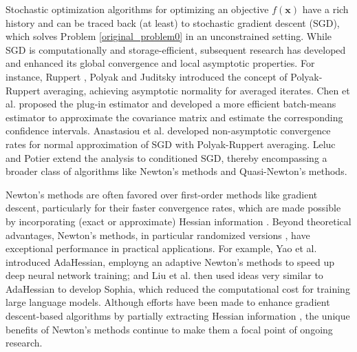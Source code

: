 \documentclass[aos]{imsart}
\numberwithin{equation}{section}
\theoremstyle{plain}
\begin{document}
Stochastic optimization algorithms for optimizing an objective $f(\bm{x})$ have a rich history and can be traced back (at least) to stochastic gradient descent (SGD), which solves Problem \eqref{original_problem0} in an unconstrained setting. 
While SGD is computationally and storage-efficient, subsequent research has developed and enhanced its global convergence and local asymptotic properties.
For instance, Ruppert \cite{ruppert1988efficient}, Polyak and Juditsky\cite{polyak1992acceleration} introduced the concept of Polyak-Ruppert averaging, achieving asymptotic normality for averaged iterates.
Chen et al. \cite{chen2020statistical} proposed the plug-in estimator and developed a more efficient batch-means estimator to approximate the covariance matrix and estimate the corresponding confidence intervals. 
Anastasiou et al. \cite{anastasiou2019normal} developed non-asymptotic convergence rates for normal approximation of SGD with Polyak-Ruppert averaging. 
Leluc and Potier \cite{leluc2020asymptotic} extend the analysis to conditioned SGD, thereby encompassing a broader class of algorithms like Newton's methods and Quasi-Newton's methods.



Newton's methods are often favored over first-order methods like gradient descent, particularly for their faster convergence rates, which are made possible by incorporating (exact or approximate) Hessian information \cite{jorge2006numerical, na2022hessian, yue2019quadratic}.
Beyond theoretical advantages, Newton's methods, in particular randomized versions \cite{fred_SSN_JRNL,XRM17_theory_TR,XRM17_empirical_TR,YXRM18_TR}, have exceptional performance in practical applications. 
For example, Yao et al. \cite{yao2021adahessian} introduced AdaHessian, employng an adaptive Newton's methods to speed up deep neural network training; and 
Liu et al. \cite{liu2023sophia} then used ideas very similar to AdaHessian to develop Sophia, which reduced the computational cost for training large language models. 
Although efforts have been made to enhance gradient descent-based algorithms by partially extracting Hessian information \cite{carmon2017convex, carmon2018accelerated, allen2018make}, the unique benefits of Newton's methods continue to make them a focal point of ongoing research.
\end{document}
